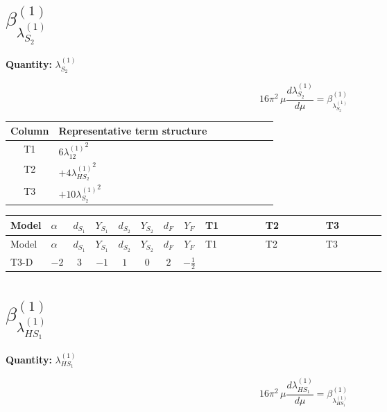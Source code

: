 \documentclass[8pt]{article}
\begin{document}
\begin{landscape}
\section*{$\beta_{\lambda_{S_2}^{(1)}}^{(1)}$}
\noindent\textbf{Quantity: }$\lambda_{S_2}^{(1)}$\par\smallskip
\[16\pi^2\,\mu\frac{d \lambda_{S_2}^{(1)}}{d\mu}=\beta_{\lambda_{S_2}^{(1)}}^{(1)}\]
\begin{center}
\begin{tabular}{@{}c >{\raggedright\arraybackslash}p{0.82\linewidth}@{}}
\toprule
Column & Representative term structure \\
\midrule
T1 & \(\displaystyle 6 {\lambda_{12}^{(1)}}^2\) \\
\midrule
T2 & \(\displaystyle +4 {\lambda_{HS_2}^{(1)}}^2\) \\
\midrule
T3 & \(\displaystyle +10 {\lambda_{S_2}^{(1)}}^2\) \\
\midrule
\bottomrule
\end{tabular}
\end{center}
\smallskip
\tiny
\begin{longtable}{@{}llcccccc >{\raggedright\arraybackslash}p{0.21\linewidth} >{\raggedright\arraybackslash}p{0.21\linewidth} >{\raggedright\arraybackslash}p{0.21\linewidth}@{}}
\toprule
Model & $\alpha$ & $d_{S_1}$ & $Y_{S_1}$ & $d_{S_2}$ & $Y_{S_2}$ & $d_F$ & $Y_F$ & T1 & T2 & T3 \\
\midrule
\endfirsthead
\toprule
Model & $\alpha$ & $d_{S_1}$ & $Y_{S_1}$ & $d_{S_2}$ & $Y_{S_2}$ & $d_F$ & $Y_F$ & T1 & T2 & T3 \\
\midrule
\endhead
T3-D & $-2$ & $3$ & $-1$ & $1$ & $0$ & $2$ & $-\frac{1}{2}$ & \scriptsize\adjustbox{max width=\linewidth}{$\begin{gathered} 6 {\lambda_{12}^{(1)}}^2\end{gathered}$} & \scriptsize\adjustbox{max width=\linewidth}{$\begin{gathered} +4 {\lambda_{HS_2}^{(1)}}^2\end{gathered}$} & \scriptsize\adjustbox{max width=\linewidth}{$\begin{gathered} +10 {\lambda_{S_2}^{(1)}}^2\end{gathered}$} \\
\midrule
\bottomrule
\end{longtable}
\clearpage
\section*{$\beta_{\lambda_{HS_1}^{(1)}}^{(1)}$}
\noindent\textbf{Quantity: }$\lambda_{HS_1}^{(1)}$\par\smallskip
\[16\pi^2\,\mu\frac{d \lambda_{HS_1}^{(1)}}{d\mu}=\beta_{\lambda_{HS_1}^{(1)}}^{(1)}\]

\end{landscape}
\end{document}
